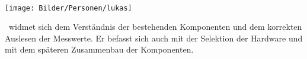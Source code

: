 \paragraph{\fenkart}
\begin{minipage}{0.37\textwidth}
	\centering
	\texttt{[image: Bilder/Personen/lukas]}
\end{minipage}
\hfill
\begin{minipage}{0.6\textwidth}
    \fenkart \ widmet sich dem Verständnis der bestehenden Komponenten und dem korrekten Auslesen der Messwerte. Er befasst sich auch mit der Selektion der Hardware und mit dem späteren Zusammenbau der Komponenten.
\end{minipage}%
\vspace{1ex}
